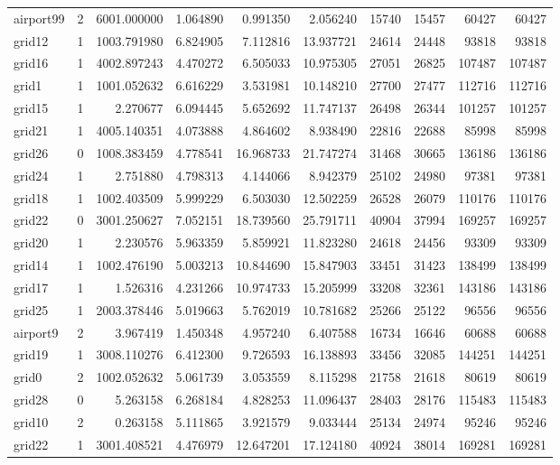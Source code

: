 \begin{longtable}{|l|r|r|r|r|r|r|r|r|r|}
airport99 & 2 & 6001.000000 & 1.064890 & 0.991350 & 2.056240 & 15740 & 15457 & 60427 & 60427 \\
grid12 & 1 & 1003.791980 & 6.824905 & 7.112816 & 13.937721 & 24614 & 24448 & 93818 & 93818 \\
grid16 & 1 & 4002.897243 & 4.470272 & 6.505033 & 10.975305 & 27051 & 26825 & 107487 & 107487 \\
grid1 & 1 & 1001.052632 & 6.616229 & 3.531981 & 10.148210 & 27700 & 27477 & 112716 & 112716 \\
grid15 & 1 & 2.270677 & 6.094445 & 5.652692 & 11.747137 & 26498 & 26344 & 101257 & 101257 \\
grid21 & 1 & 4005.140351 & 4.073888 & 4.864602 & 8.938490 & 22816 & 22688 & 85998 & 85998 \\
grid26 & 0 & 1008.383459 & 4.778541 & 16.968733 & 21.747274 & 31468 & 30665 & 136186 & 136186 \\
grid24 & 1 & 2.751880 & 4.798313 & 4.144066 & 8.942379 & 25102 & 24980 & 97381 & 97381 \\
grid18 & 1 & 1002.403509 & 5.999229 & 6.503030 & 12.502259 & 26528 & 26079 & 110176 & 110176 \\
grid22 & 0 & 3001.250627 & 7.052151 & 18.739560 & 25.791711 & 40904 & 37994 & 169257 & 169257 \\
grid20 & 1 & 2.230576 & 5.963359 & 5.859921 & 11.823280 & 24618 & 24456 & 93309 & 93309 \\
grid14 & 1 & 1002.476190 & 5.003213 & 10.844690 & 15.847903 & 33451 & 31423 & 138499 & 138499 \\
grid17 & 1 & 1.526316 & 4.231266 & 10.974733 & 15.205999 & 33208 & 32361 & 143186 & 143186 \\
grid25 & 1 & 2003.378446 & 5.019663 & 5.762019 & 10.781682 & 25266 & 25122 & 96556 & 96556 \\
airport9 & 2 & 3.967419 & 1.450348 & 4.957240 & 6.407588 & 16734 & 16646 & 60688 & 60688 \\
grid19 & 1 & 3008.110276 & 6.412300 & 9.726593 & 16.138893 & 33456 & 32085 & 144251 & 144251 \\
grid0 & 2 & 1002.052632 & 5.061739 & 3.053559 & 8.115298 & 21758 & 21618 & 80619 & 80619 \\
grid28 & 0 & 5.263158 & 6.268184 & 4.828253 & 11.096437 & 28403 & 28176 & 115483 & 115483 \\
grid10 & 2 & 0.263158 & 5.111865 & 3.921579 & 9.033444 & 25134 & 24974 & 95246 & 95246 \\
grid22 & 1 & 3001.408521 & 4.476979 & 12.647201 & 17.124180 & 40924 & 38014 & 169281 & 169281 \\

\end{longtable}
